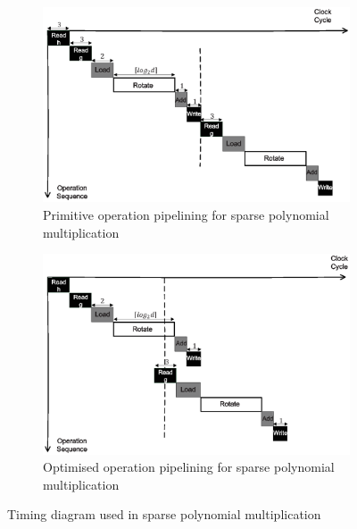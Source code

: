 \documentclass[runningheads]{llncs}
\begin{document}
\begin{figure}[!tb]
\centering
\begin{subfigure}[t]{0.47\textwidth}\centering
\includegraphics[width=\textwidth]{./fig/pipeline_mul.eps}
\caption{Primitive operation pipelining for sparse polynomial multiplication}
\label{fig:pipeline_mul}
\end{subfigure}
\hspace{1em}
\begin{subfigure}[t]{0.47\textwidth}\centering
\includegraphics[width=\textwidth]{./fig/pipeline_mul2.eps}
\caption{Optimised operation pipelining for sparse polynomial multiplication }
\label{fig:pipeline_mul2}
\end{subfigure}
\caption{Timing diagram used in sparse polynomial multiplication}
\end{figure}
\end{document}
